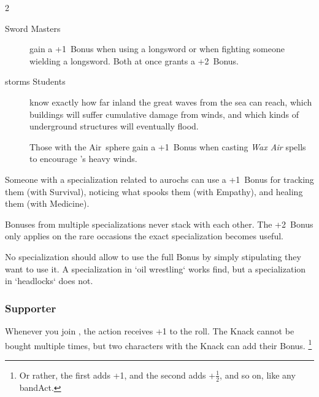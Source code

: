 \begin{multicols}{2}
\begin{description}
  \item[Sword Masters]
  gain a +1~Bonus when using a longsword or when fighting someone wielding a
  longsword.  Both at once grants a +2~Bonus.

  \item[\Glspl{storm} Students]
  know exactly how far inland the great waves from the sea can reach, which
  buildings will suffer cumulative damage from winds, and which kinds of
  underground structures will eventually flood.

  Those with the Air~\gls{sphere} gain a +1~Bonus when casting \textit{Wax Air}
  \glspl{spell} to encourage 's heavy winds.
\end{description}

Someone with a specialization related to aurochs can use a +1~Bonus for
tracking them (with Survival), noticing what spooks them (with Empathy), and
healing them (with Medicine).

Bonuses from multiple specializations never stack with each other.  The
+2~Bonus only applies on the rare occasions the exact specialization becomes
useful.

No specialization should allow  to use the full Bonus by simply
stipulating they want to use it.  A specialization in `oil wrestling` works
find, but a specialization in `headlocks` does not.

\subsubsection{Supporter}
Whenever you join , the action receives +1 to the roll.
The Knack cannot be bought multiple times, but two characters with the Knack can add their Bonus.%
\footnote{Or rather, the first adds +1, and the second adds +$\frac{1}{2}$, and so on, like any \gls{bandAct}.}

\end{multicols}
